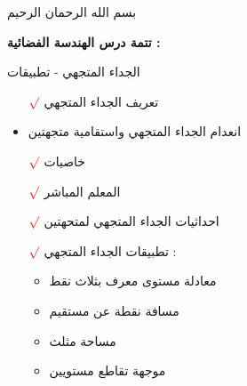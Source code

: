 \begin{frame}[plain]\transsplitverticalout
\begin{tcolorbox}[colback=white,drop large lifted shadow,top=.5cm,bottom=.5cm]
	{\begin{center}
			{\large{بسم الله الرحمان الرحيم}} %
			\maketitle
	\end{center}}
\end{tcolorbox}
\end{frame}

\begin{frame}[plain]{\large \textbf{\huge	تتمة درس الهندسة الفضائية	:}}
\transglitter[duration=0.5]

\begin{tcolorbox}[colback=white,drop large lifted shadow,top=.5cm,bottom=.5cm]
\begin{center}
	\begin{LARGE}
		{\color{blue}\huge
			{  الجداء المتجهي - تطبيقات
		}}
	\end{LARGE}
\end{center}
\end{tcolorbox}



\begin{itemize}%
	\RTListe %
\item[$\textcolor{red}{\surd}$] 
تعريف الجداء المتجهي 
\item 
انعدام الجداء المتجهي  واستقامية متجهتين
\item [$\textcolor{red}{\surd}$] 
خاصيات
\item [$\textcolor{red}{\surd}$] 
المعلم المباشر

\item [$\textcolor{red}{\surd}$] 
احداثيات الجداء المتجهي لمتحهتين
\item [$\textcolor{red}{\surd}$] 
تطبيقات  الجداء المتجهي :

\begin{itemize}%
	\RTListe
	\item 
	معادلة مستوى معرف بثلاث نقط
	\item 
	مسافة نقطة عن مستقيم
	\item 
	مساحة مثلث
		\item 
	موجهة تقاطع مستويين
\end{itemize}
\end{itemize}
\end{frame}
